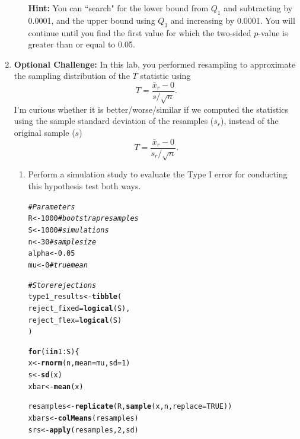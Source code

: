 \documentclass{article}\usepackage[]{graphicx}\usepackage[]{xcolor}
\makeatletter
\newcommand{\hlnum}[1]{\textcolor[rgb]{0.686,0.059,0.569}{#1}}%
\newcommand{\hlcom}[1]{\textcolor[rgb]{0.678,0.584,0.686}{\textit{#1}}}%
\newcommand{\hlopt}[1]{\textcolor[rgb]{0,0,0}{#1}}%
\newcommand{\hldef}[1]{\textcolor[rgb]{0.345,0.345,0.345}{#1}}%
\newcommand{\hlkwa}[1]{\textcolor[rgb]{0.161,0.373,0.58}{\textbf{#1}}}%
\newcommand{\hlkwb}[1]{\textcolor[rgb]{0.69,0.353,0.396}{#1}}%
\newcommand{\hlkwc}[1]{\textcolor[rgb]{0.333,0.667,0.333}{#1}}%
\newcommand{\hlkwd}[1]{\textcolor[rgb]{0.737,0.353,0.396}{\textbf{#1}}}%
\newenvironment{kframe}{%
 \def\at@end@of@kframe{}%
 \ifinner\ifhmode%
  \def\at@end@of@kframe{\end{minipage}}%
  \begin{minipage}{\columnwidth}%
 \fi\fi%
 \def\FrameCommand##1{\hskip\@totalleftmargin \hskip-\fboxsep
 \colorbox{shadecolor}{##1}\hskip-\fboxsep
     \hskip-\linewidth \hskip-\@totalleftmargin \hskip\columnwidth}%
 \MakeFramed {\advance\hsize-\width
   \@totalleftmargin\z@ \linewidth\hsize
   \@setminipage}}%
 {\par\unskip\endMakeFramed%
 \at@end@of@kframe}
\newenvironment{knitrout}{}{} %
\makeatother
\begin{document}
\begin{enumerate}
\begin{enumerate}
  \textbf{Hint:} You can ``search" for the lower bound from $Q_1$ and subtracting by 0.0001, 
  and the upper bound using $Q_3$ and increasing by 0.0001. You will continue until you find 
  the first value for which the two-sided $p$-value is greater than or equal to 0.05.
\end{enumerate}
\item \textbf{Optional Challenge:} In this lab, you performed resampling to 
approximate the sampling distribution of the $T$ statistic using
\[T = \frac{\bar{x}_r - 0}{s/\sqrt{n}}.\]
I'm curious whether it is better/worse/similar if we computed the statistics
using the sample standard deviation of the resamples ($s_r$), instead of the 
original sample ($s$)
  \[T = \frac{\bar{x}_r - 0}{s_r/\sqrt{n}}.\]
\begin{enumerate}
  \item Perform a simulation study to evaluate the Type I error for conducting this
hypothesis test both ways.
\begin{knitrout}
\color{fgcolor}\begin{kframe}
\begin{alltt}
\hlcom{# Parameters}
\hldef{R} \hlkwb{<-} \hlnum{1000}   \hlcom{# bootstrap resamples}
\hldef{S} \hlkwb{<-} \hlnum{1000}   \hlcom{# simulations}
\hldef{n} \hlkwb{<-} \hlnum{30}     \hlcom{# sample size}
\hldef{alpha} \hlkwb{<-} \hlnum{0.05}
\hldef{mu} \hlkwb{<-} \hlnum{0}     \hlcom{# true mean}

\hlcom{# Store rejections}
\hldef{type1_results} \hlkwb{<-} \hlkwd{tibble}\hldef{(}
  \hlkwc{reject_fixed} \hldef{=} \hlkwd{logical}\hldef{(S),}
  \hlkwc{reject_flex}  \hldef{=} \hlkwd{logical}\hldef{(S)}
\hldef{)}

\hlkwa{for} \hldef{(i} \hlkwa{in} \hlnum{1}\hlopt{:}\hldef{S) \{}
  \hldef{x} \hlkwb{<-} \hlkwd{rnorm}\hldef{(n,} \hlkwc{mean} \hldef{= mu,} \hlkwc{sd} \hldef{=} \hlnum{1}\hldef{)}
  \hldef{s} \hlkwb{<-} \hlkwd{sd}\hldef{(x)}
  \hldef{xbar} \hlkwb{<-} \hlkwd{mean}\hldef{(x)}

  \hldef{resamples} \hlkwb{<-} \hlkwd{replicate}\hldef{(R,} \hlkwd{sample}\hldef{(x, n,} \hlkwc{replace} \hldef{=} \hlnum{TRUE}\hldef{))}
  \hldef{xbars} \hlkwb{<-} \hlkwd{colMeans}\hldef{(resamples)}
  \hldef{srs} \hlkwb{<-} \hlkwd{apply}\hldef{(resamples,} \hlnum{2}\hldef{, sd)}


\end{alltt}
\end{kframe}
\end{knitrout}
\end{enumerate}
\end{enumerate}
\end{document}
